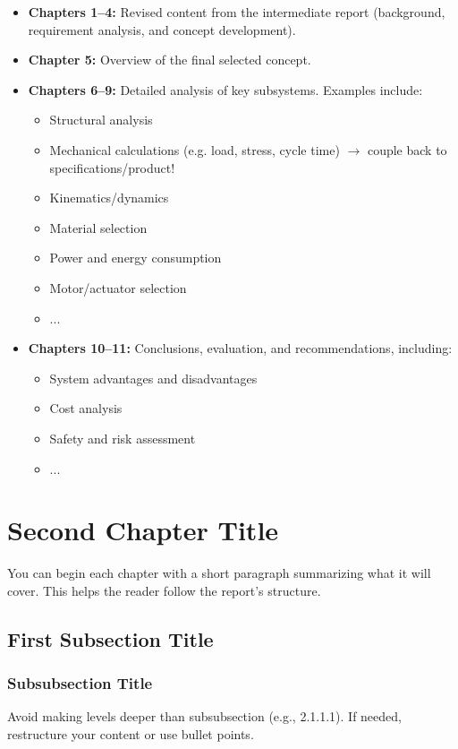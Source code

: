 \documentclass[11pt]{article}
\begin{document}
\begin{itemize}
  \item \textbf{Chapters 1–4:} Revised content from the intermediate report (background, requirement analysis, and concept development).
  \item \textbf{Chapter 5:} Overview of the final selected concept.
  \item \textbf{Chapters 6–9:} Detailed analysis of key subsystems. Examples include:
  \begin{itemize}
    \item Structural analysis
    \item Mechanical calculations (e.g. load, stress, cycle time) $\rightarrow$ couple back to specifications/product!
    \item Kinematics/dynamics
    \item Material selection
    \item Power and energy consumption
    \item Motor/actuator selection
     \item ...
  \end{itemize}
  \item \textbf{Chapters 10–11:} Conclusions, evaluation, and recommendations, including:
  \begin{itemize}
    \item System advantages and disadvantages
    \item Cost analysis
    \item Safety and risk assessment
    \item ...
  \end{itemize}
\end{itemize}

\newpage
\section{Second Chapter Title}

You can begin each chapter with a short paragraph summarizing what it will cover. This helps the reader follow the report's structure.

\subsection{First Subsection Title}
\lipsum[3]

\subsubsection{Subsubsection Title}
Avoid making levels deeper than subsubsection (e.g., 2.1.1.1). If needed, restructure your content or use bullet points.
\end{document}
